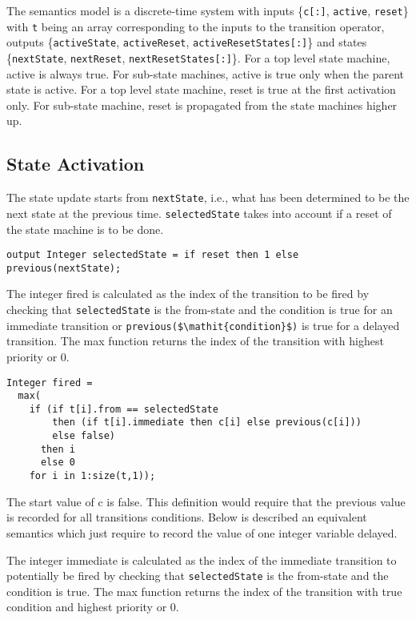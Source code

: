 The semantics model is a discrete-time system with inputs \{\lstinline!c[:]!,
\lstinline!active!, \lstinline!reset!\} with \lstinline!t! being an array corresponding to the inputs to the
transition operator, outputs \{\lstinline!activeState!, \lstinline!activeReset!,
\lstinline!activeResetStates[:]!\} and states \{\lstinline!nextState!, \lstinline!nextReset!,
\lstinline!nextResetStates[:]!\}. For a top level state machine, active is
always true. For sub-state machines, active is true only when the parent
state is active. For a top level state machine, reset is true at the
first activation only. For sub-state machine, reset is propagated from
the state machines higher up.

\subsection{State Activation}\label{state-activation}

The state update starts from \lstinline!nextState!, i.e., what has been determined to be the next state at the previous time.
\lstinline!selectedState! takes into account if a reset of the state machine is to be done.

\begin{lstlisting}[language=modelica]
output Integer selectedState = if reset then 1 else previous(nextState);
\end{lstlisting}
The integer fired is calculated as the index of the transition to be fired by checking that \lstinline!selectedState! is the from-state and the condition is true for an immediate transition or \lstinline!previous($\mathit{condition}$)! is true for a delayed transition.  The max function returns the index of the transition with highest priority or 0.

\begin{lstlisting}[language=modelica]
Integer fired =
  max(
    if (if t[i].from == selectedState
        then (if t[i].immediate then c[i] else previous(c[i]))
        else false)
      then i
      else 0
    for i in 1:size(t,1));
\end{lstlisting}
The start value of c is false. This definition would require that the
previous value is recorded for all transitions conditions. Below is
described an equivalent semantics which just require to record the value
of one integer variable delayed.

The integer immediate is calculated as the index of the immediate
transition to potentially be fired by checking that \lstinline!selectedState! is the
from-state and the condition is true. The max function returns the index
of the transition with true condition and highest priority or 0.

